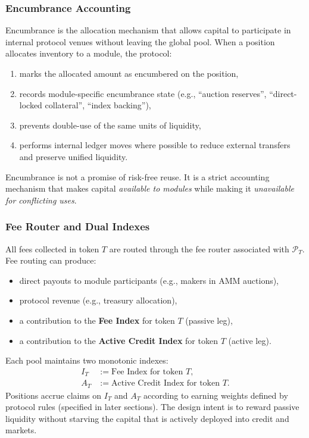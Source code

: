 \documentclass[version=preprint]{iacrcc}
\begin{document}
\subsubsection{Encumbrance Accounting}

Encumbrance is the allocation mechanism that allows capital to participate in internal protocol venues without leaving the global pool. When a position allocates inventory to a module, the protocol:
\begin{enumerate}
  \item marks the allocated amount as encumbered on the position,
  \item records module-specific encumbrance state (e.g., ``auction reserves'', ``direct-locked collateral'', ``index backing''),
  \item prevents double-use of the same units of liquidity,
  \item performs internal ledger moves where possible to reduce external transfers and preserve unified liquidity.
\end{enumerate}

Encumbrance is not a promise of risk-free reuse. It is a strict accounting mechanism that makes capital \textit{available to modules} while making it \textit{unavailable for conflicting uses}.

\subsubsection{Fee Router and Dual Indexes}

All fees collected in token $T$ are routed through the fee router associated with $\mathcal{P}_T$. Fee routing can produce:
\begin{itemize}
  \item direct payouts to module participants (e.g., makers in AMM auctions),
  \item protocol revenue (e.g., treasury allocation),
  \item a contribution to the \textbf{Fee Index} for token $T$ (passive leg),
  \item a contribution to the \textbf{Active Credit Index} for token $T$ (active leg).
\end{itemize}

Each pool maintains two monotonic indexes:
\begin{align*}
I_T &:= \text{Fee Index for token } T, \\
A_T &:= \text{Active Credit Index for token } T.
\end{align*}
Positions accrue claims on $I_T$ and $A_T$ according to earning weights defined by protocol rules (specified in later sections). The design intent is to reward passive liquidity without starving the capital that is actively deployed into credit and markets.
\end{document}
